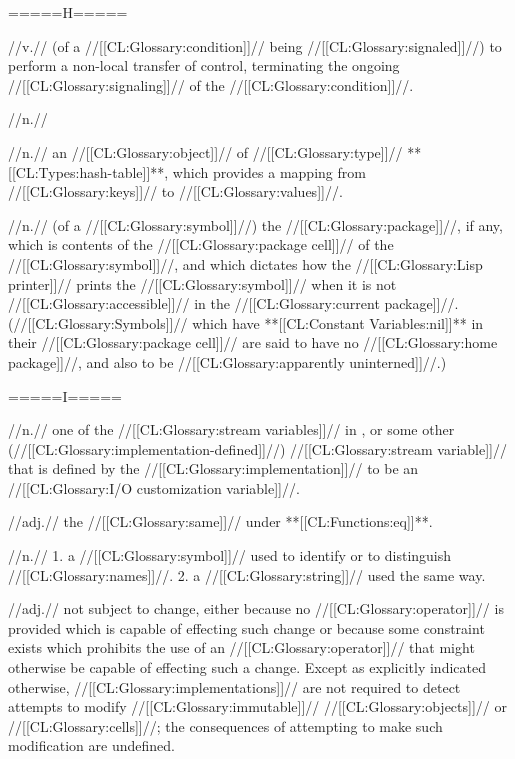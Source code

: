 =====H=====

 //v.// (of a //[[CL:Glossary:condition]]// being //[[CL:Glossary:signaled]]//) to perform a non-local transfer of control, terminating the ongoing //[[CL:Glossary:signaling]]// of the //[[CL:Glossary:condition]]//.

 //n.// %

 //n.// an //[[CL:Glossary:object]]// of //[[CL:Glossary:type]]// **[[CL:Types:hash-table]]**, which provides a mapping from //[[CL:Glossary:keys]]// to //[[CL:Glossary:values]]//.

 //n.// (of a //[[CL:Glossary:symbol]]//) the //[[CL:Glossary:package]]//, if any, which is contents of the //[[CL:Glossary:package cell]]// of the //[[CL:Glossary:symbol]]//, and which dictates how the //[[CL:Glossary:Lisp printer]]// prints the //[[CL:Glossary:symbol]]// when it is not //[[CL:Glossary:accessible]]// in the //[[CL:Glossary:current package]]//. (//[[CL:Glossary:Symbols]]// which have **[[CL:Constant Variables:nil]]** in their //[[CL:Glossary:package cell]]// are said to have no //[[CL:Glossary:home package]]//, and also to be //[[CL:Glossary:apparently uninterned]]//.)

=====I===== 

 //n.// one of the //[[CL:Glossary:stream variables]]// in \thenextfigure, or some other (//[[CL:Glossary:implementation-defined]]//) //[[CL:Glossary:stream variable]]// that is defined by the //[[CL:Glossary:implementation]]// to be an //[[CL:Glossary:I/O customization variable]]//.


 //adj.// the //[[CL:Glossary:same]]// under **[[CL:Functions:eq]]**.

 //n.// 1. a //[[CL:Glossary:symbol]]// used to identify or to distinguish //[[CL:Glossary:names]]//. 2. a //[[CL:Glossary:string]]// used the same way. 
 
 //adj.// not subject to change, either because no //[[CL:Glossary:operator]]// is provided which is capable of effecting such change or because some constraint exists which prohibits the use of an //[[CL:Glossary:operator]]// that might otherwise be capable of effecting such a change. Except as explicitly indicated otherwise, //[[CL:Glossary:implementations]]// are not required to detect attempts to modify //[[CL:Glossary:immutable]]// //[[CL:Glossary:objects]]// or //[[CL:Glossary:cells]]//; the consequences of attempting to make such modification are undefined. 

